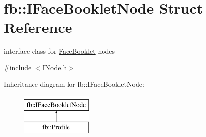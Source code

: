 \hypertarget{structfb_1_1_i_face_booklet_node}{\section{fb\+:\+:I\+Face\+Booklet\+Node Struct Reference}
\label{structfb_1_1_i_face_booklet_node}
}


interface class for \hyperlink{classfb_1_1_face_booklet}{Face\+Booklet} nodes  




{\ttfamily \#include $<$I\+Node.\+h$>$}

Inheritance diagram for fb\+:\+:I\+Face\+Booklet\+Node\+:\begin{figure}[H]
\begin{center}
\leavevmode
\includegraphics[height=2.000000cm]{structfb_1_1_i_face_booklet_node}
\end{center}
\end{figure}
